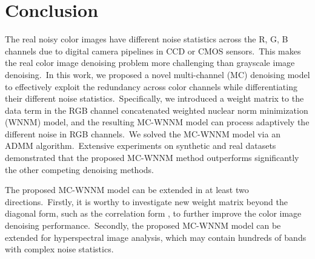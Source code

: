 \section{Conclusion}

The real noisy color images have different noise statistics across the R, G, B channels due to digital camera pipelines in CCD or CMOS sensors.\ This makes the real color image denoising problem more challenging than grayscale image denoising.\ In this work, we proposed a novel multi-channel (MC) denoising model to effectively exploit the redundancy across color channels while differentiating their different noise statistics.\ Specifically, we introduced a weight matrix to the data term in the RGB channel concatenated weighted nuclear norm minimization (WNNM) model, and the resulting MC-WNNM model can process adaptively the different noise in RGB channels.\ We solved the MC-WNNM model via an ADMM algorithm.\ Extensive experiments on synthetic and real datasets demonstrated that the proposed MC-WNNM method outperforms significantly the other competing denoising methods.

The proposed MC-WNNM model can be extended in at least two directions.\ Firstly, it is worthy to investigate new weight matrix beyond the diagonal form, such as the correlation form \cite{nearcor}, to further improve the color image denoising performance.\ Secondly, the proposed MC-WNNM model can be extended for hyperspectral image analysis, which may contain hundreds of bands with complex noise statistics.